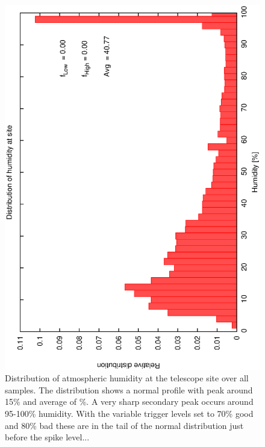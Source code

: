 \clearpage 
\begin{figure}[htbp]
  \begin{center}
    \includegraphics[scale=0.4, angle=-90]{figures/ecs/hum.dat.eps}
  \end{center}
  \caption[Relative distribution of humidity at telescope site.]
{Distribution of atmospheric humidity at the telescope site over all samples. The distribution shows a normal profile with peak around 15\% and average of \%. A very sharp secondary peak occurs around 95-100\% humidity. With the variable trigger levels set to 70\% good and 80\% bad these are in the tail of the normal distribution just before the spike level...}
  \label{fig:met_humidity_dist}
\end{figure}
